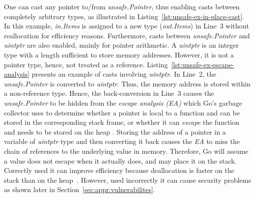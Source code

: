 One can cast any pointer to/from \textit{unsafe.Pointer}, thus enabling casts between completely arbitrary types, as illustrated in  
%
Listing~\ref{lst:unsafe-ex-in-place-cast}.
In this example, \textit{in.Items} is assigned to a new type (\textit{out.Items}) in Line~3 without reallocation for efficiency reasons. %
Furthermore, casts between \textit{unsafe.Pointer} and \textit{uintptr} are also enabled, mainly for pointer arithmetic.
A \textit{uintptr} is an integer type with a length sufficient to store memory addresses. 
However, it is not a pointer type, hence, not treated as a reference.
%
Listing~\ref{lst:unsafe-ex-escape-analysis} presents an example of casts involving \textit{uintptr}. 
In Line~2, the \textit{unsafe.Pointer} is converted to \textit{uintptr}.
Thus, the memory address is stored within a non-reference type.
Hence, the back-conversion in Line~3 causes the \textit{unsafe.Pointer} to be hidden from the \textit{escape analysis (EA)} which Go's garbage collector uses 
to determine whether a pointer is local to a function and can be stored in the corresponding stack frame, 
or whether it can \textit{escape} the function and needs to be stored on the heap \cite{wang2020}. 
Storing the address of a pointer in a variable of \textit{uintptr} type and then converting it back causes the \textit{EA} to miss the chain of references to the underlying value in memory. 
Therefore, Go will assume a value does not escape when it actually does, and may place it on the stack.
Correctly used it can improve efficiency because deallocation is faster on the stack than on the heap~\cite{wang2020}.
However, used incorrectly it can cause security problems as shown later in Section~\ref{sec:appr:vulnerabilites}.

